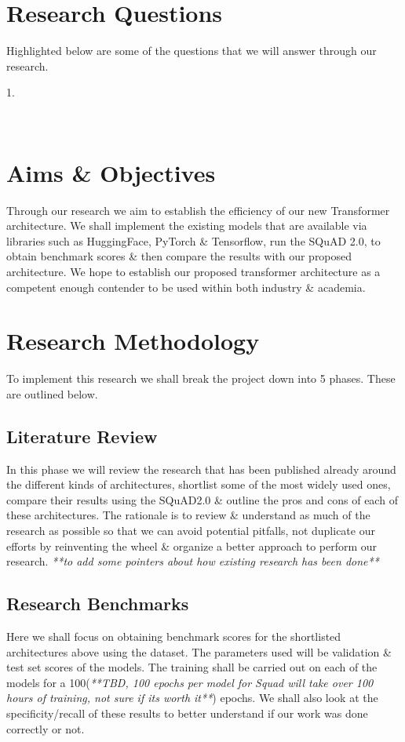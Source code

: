 \documentclass[11pt]{article}
\begin{document}
\section{Research Questions}\label{Section-Conclusions}
Highlighted below are some of the questions that we will answer through our research.

1. 

\
\newpage
\section{Aims \& Objectives}

Through our research we aim to establish the efficiency of our new Transformer architecture. We shall implement the existing models that are available via libraries such as HuggingFace\cite{hfTransformers}, PyTorch \& Tensorflow, run the SQuAD 2.0\cite{dataset}, to obtain benchmark scores \& then compare the results with our proposed architecture. We hope to establish our proposed transformer architecture as a competent enough contender to be used within both industry \& academia.
\section{Research Methodology}

To implement this research we shall break the project down into 5 phases. These are outlined below.
\subsection{Literature Review}
In this phase we will review the research that has been published already around the different kinds of architectures, shortlist some of the most widely used ones, compare their results using the SQuAD2.0 \cite{dataset} \& outline the pros and cons of each of these architectures. The rationale is to review \& understand as much of the research as possible so that we can avoid potential pitfalls, not duplicate our efforts by reinventing the wheel \& organize a better approach to perform our research.\textit{ **to add some pointers about how existing research has been done**}
\subsection{Research Benchmarks}
Here we shall focus on obtaining benchmark scores for the shortlisted architectures above using the dataset\cite{dataset}. The parameters used will be validation \& test set scores of the models. The training shall be carried out on each of the models for a 100(\textit{**TBD, 100 epochs per model for Squad will take over 100 hours of training, not sure if its worth it**}) epochs. We shall also look at the specificity/recall of these results to better understand if our work was done correctly or not.
\end{document}
